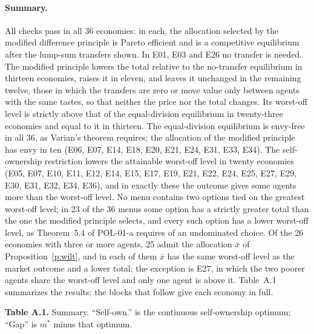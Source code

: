 \documentclass{situationist-preprint}
\begin{document}
\paragraph{Summary.} All checks pass in all 36 economies: in each, the allocation selected by the modified difference principle is Pareto efficient and is a competitive equilibrium after the lump-sum transfers shown. In E01, E03 and E26 no transfer is needed. The modified principle lowers the total relative to the no-transfer equilibrium in thirteen economies, raises it in eleven, and leaves it unchanged in the remaining twelve, those in which the transfers are zero or move value only between agents with the same tastes, so that neither the price nor the total changes. Its worst-off level is strictly above that of the equal-division equilibrium in twenty-three economies and equal to it in thirteen. The equal-division equilibrium is envy-free in all 36, as Varian's theorem requires; the allocation of the modified principle has envy in ten (E06, E07, E14, E18, E20, E21, E24, E31, E33, E34). The self-ownership restriction lowers the attainable worst-off level in twenty economies (E05, E07, E10, E11, E12, E14, E15, E17, E19, E21, E22, E24, E25, E27, E29, E30, E31, E32, E34, E36), and in exactly these the outcome gives some agents more than the worst-off level. No menu contains two options tied on the greatest worst-off level; in 23 of the 36 menus some option has a strictly greater total than the one the modified principle selects, and every such option has a lower worst-off level, as Theorem~5.4 of POL-01-a requires of an undominated choice. Of the 26 economies with three or more agents, 25 admit the allocation $\bar{x}$ of Proposition~\ref{p:wilt}, and in each of them $\bar{x}$ has the same worst-off level as the market outcome and a lower total; the exception is E27, in which the two poorer agents share the worst-off level and only one agent is above it. Table~A.1 summarizes the results; the blocks that follow give each economy in full.

\begin{center}
\textbf{Table A.1.} Summary. \enquote{Self-own.} is the continuous self-ownership optimum; \enquote{Gap} is $m^*$ minus that optimum.
\end{center}



\end{document}

